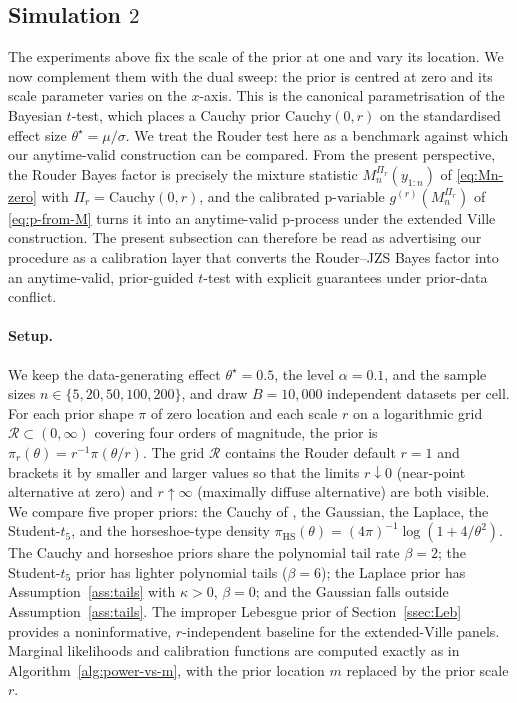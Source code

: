 \documentclass{article}%
\begin{document}
\subsection{Simulation $2$}
The experiments above fix the scale of the prior at one and vary its
location. We now complement them with the dual sweep: the prior is
centred at zero and its scale parameter varies on the \(x\)-axis.
This is the canonical parametrisation of the \cite{Rouder2009} Bayesian \(t\)-test, which places a Cauchy prior \(\mathrm{Cauchy}(0,r)\) on the standardised effect size
\(\theta^\star=\mu/\sigma\). We treat the Rouder test here as a benchmark against which our anytime-valid construction can be compared. From the present perspective, the Rouder Bayes factor is precisely the mixture statistic \(M_n^{\Pi_r}(y_{1:n})\) of \eqref{eq:Mn-zero} with \(\Pi_r=\mathrm{Cauchy}(0,r)\), and the calibrated p-variable
\(g^{(r)}(M_n^{\Pi_r})\) of \eqref{eq:p-from-M} turns it into an anytime-valid p-process under the extended Ville construction. The
present subsection can therefore be read as advertising our procedure as a calibration layer that converts the Rouder--JZS Bayes factor into an anytime-valid, prior-guided \(t\)-test with explicit guarantees under prior-data conflict.

\paragraph{Setup.} We keep the data-generating effect \(\theta^\star=0.5\), the level \(\alpha=0.1\), and the sample sizes \(n\in\{5,20,50,100,200\}\), and draw \(B=10{,}000\) independent datasets per cell. For each prior shape \(\pi\) of zero location and each scale \(r\) on a logarithmic grid \(\mathcal R\subset(0,\infty)\) covering four orders of magnitude, the prior is \(\pi_r(\theta)=r^{-1}\pi(\theta/r)\). The
grid \(\mathcal R\) contains the Rouder default \(r=1\) and brackets it by smaller and larger values so that the limits \(r\downarrow 0\) (near-point alternative at zero) and \(r\uparrow\infty\) (maximally diffuse alternative) are both visible. We compare five proper priors: the Cauchy of \cite{Rouder2009}, the Gaussian, the Laplace, the Student-\(t_5\), and the horseshoe-type density \(\pi_{\mathrm{HS}}(\theta)=(4\pi)^{-1}\log(1+4/\theta^2)\). The
Cauchy and horseshoe priors share the polynomial tail rate \(\beta=2\); the Student-\(t_5\) prior has lighter polynomial tails
(\(\beta=6\)); the Laplace prior has Assumption~\ref{ass:tails} with \(\kappa>0\), \(\beta=0\); and the Gaussian falls outside Assumption~\ref{ass:tails}. The improper Lebesgue prior of Section~\ref{ssec:Leb} provides a noninformative, \(r\)-independent
baseline for the extended-Ville panels. Marginal likelihoods and calibration functions are computed exactly as in Algorithm~\ref{alg:power-vs-m}, with the prior location \(m\) replaced by the prior scale \(r\).
\end{document}
